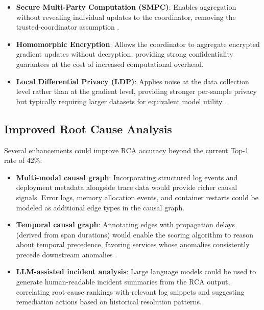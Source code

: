 \begin{itemize}
    \item \textbf{Secure Multi-Party Computation (SMPC)}: Enables aggregation
    without revealing individual updates to the coordinator, removing the
    trusted-coordinator assumption \cite{bonawitz2019towards}.

    \item \textbf{Homomorphic Encryption}: Allows the coordinator to aggregate
    encrypted gradient updates without decryption, providing strong
    confidentiality guarantees at the cost of increased computational overhead.

    \item \textbf{Local Differential Privacy (LDP)}: Applies noise at the
    data collection level rather than at the gradient level, providing
    stronger per-sample privacy but typically requiring larger datasets for
    equivalent model utility \cite{dwork2014algorithmic}.
\end{itemize}

\subsection{Improved Root Cause Analysis}
\label{subsec:future_rca}

Several enhancements could improve RCA accuracy beyond the current Top-1 rate
of 42\%:

\begin{itemize}
    \item \textbf{Multi-modal causal graph}: Incorporating structured log
    events and deployment metadata alongside trace data would provide richer
    causal signals. Error logs, memory allocation events, and container
    restarts could be modeled as additional edge types in the causal graph.

    \item \textbf{Temporal causal graph}: Annotating edges with propagation
    delays (derived from span durations) would enable the scoring algorithm
    to reason about temporal precedence, favoring services whose anomalies
    consistently precede downstream anomalies \cite{fu2020root}.

    \item \textbf{LLM-assisted incident analysis}: Large language models could
    be used to generate human-readable incident summaries from the RCA output,
    correlating root-cause rankings with relevant log snippets and suggesting
    remediation actions based on historical resolution patterns.
\end{itemize}

